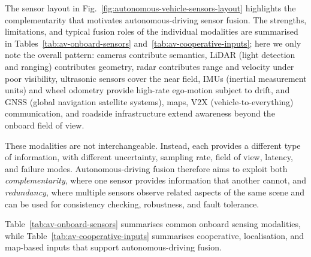 \documentclass[graybox,envcountchap]{style/SNmono}
\begin{document}
The sensor layout in Fig.~\ref{fig:autonomous-vehicle-sensors-layout} highlights the complementarity that motivates autonomous-driving sensor fusion. The strengths, limitations, and typical fusion roles of the individual modalities are summarised in Tables~\ref{tab:av-onboard-sensors} and~\ref{tab:av-cooperative-inputs}; here we only note the overall pattern: cameras contribute semantics, LiDAR (light detection and ranging) contributes geometry, radar contributes range and velocity under poor visibility, ultrasonic sensors cover the near field, IMUs (inertial measurement units) and wheel odometry provide high-rate ego-motion subject to drift, and GNSS (global navigation satellite systems), maps, V2X (vehicle-to-everything) communication, and roadside infrastructure extend awareness beyond the onboard field of view.

These modalities are not interchangeable. Instead, each provides a different type of information, with different uncertainty, sampling rate, field of view, latency, and failure modes. Autonomous-driving fusion therefore aims to exploit both \emph{complementarity}, where one sensor provides information that another cannot, and \emph{redundancy}, where multiple sensors observe related aspects of the same scene and can be used for consistency checking, robustness, and fault tolerance.

Table~\ref{tab:av-onboard-sensors} summarises common onboard sensing modalities, while Table~\ref{tab:av-cooperative-inputs} summarises cooperative, localisation, and map-based inputs that support autonomous-driving fusion.
\end{document}
